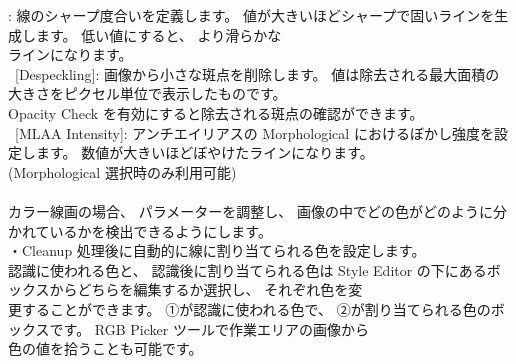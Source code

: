 \documentclass[a4paper,10pt]{article}
\begin{document}
\newpage

\noindent [Sharpness]: 線のシャープ度合いを定義します。 値が大きいほどシャープで固いラインを生成します。 低い値にすると、 より滑らかな\\
ラインになります。\\
\ [Despeckling]: 画像から小さな斑点を削除します。 値は除去される最大面積の大きさをピクセル単位で表示したものです。\\
Opacity Check を有効にすると除去される斑点の確認ができます。\\
\ [MLAA Intensity]: アンチエイリアスの Morphological におけるぼかし強度を設定します。 数値が大きいほどぼやけたラインになります。\\
(Morphological 選択時のみ利用可能)\\
\\
\small
カラー線画の場合、 パラメーターを調整し、 画像の中でどの色がどのように分かれているかを検出できるようにします。\\
\footnotesize
・Cleanup 処理後に自動的に線に割り当てられる色を設定します。\\
認識に使われる色と、 認識後に割り当てられる色は Style Editor の下にあるボックスからどちらを編集するか選択し、 それぞれ色を変\\
更することができます。 ①が認識に使われる色で、 ②が割り当てられる色のボックスです。 RGB Picker ツールで作業エリアの画像から\\
色の値を拾うことも可能です。
\end{document}
